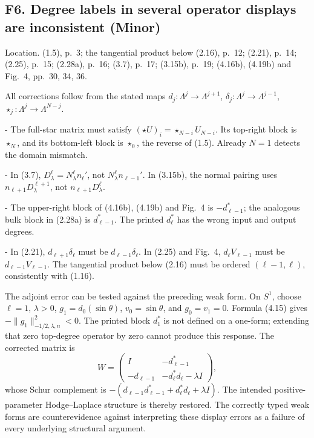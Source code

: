 \documentclass[10pt]{article}
\begin{document}
\subsection*{F6. Degree labels in several operator displays are inconsistent (Minor)}
Location. (1.5), p. 3; the tangential product below (2.16), p. 12; (2.21), p. 14; (2.25), p. 15; (2.28a), p. 16; (3.7), p. 17; (3.15b), p. 19; (4.16b), (4.19b) and Fig. 4, pp. 30, 34, 36.\par
All corrections follow from the stated maps \(d_j:\Lambda^j\to\Lambda^{j+1}\), \(\delta_j:\Lambda^j\to\Lambda^{j-1}\), \(\star_j:\Lambda^j\to\Lambda^{N-j}\).\par
- The full-star matrix must satisfy \((\star U)_i=\star_{N-i}U_{N-i}\). Its top-right block is \(\star_N\), and its bottom-left block is \(\star_0\), the reverse of (1.5). Already \(N=1\) detects the domain mismatch.\par
- In (3.7), \(D_\lambda^\ell=N_\lambda^\ell n_\ell'\), not \(N_\lambda^\ell n_{\ell-1}'\). In (3.15b), the normal pairing uses \(n_{\ell+1}D_\lambda^{\ell+1}\), not \(n_{\ell+1}D_\lambda^\ell\).\par
- The upper-right block of (4.16b), (4.19b) and Fig. 4 is \(-d_{\ell-1}^*\); the analogous bulk block in (2.28a) is \(d_{\ell-1}^*\). The printed \(d_\ell^*\) has the wrong input and output degrees.\par
- In (2.21), \(d_{\ell+1}\delta_\ell\) must be \(d_{\ell-1}\delta_\ell\). In (2.25) and Fig. 4, \(d_\ell V_{\ell-1}\) must be \(d_{\ell-1}V_{\ell-1}\). The tangential product below (2.16) must be ordered \((\ell-1,\ell)\), consistently with (1.16).\par
The adjoint error can be tested against the preceding weak form. On \(S^1\), choose \(\ell=1\), \(\lambda>0\), \(g_1=d_0(\sin\theta)\), \(v_0=\sin\theta\), and \(g_0=v_1=0\). Formula (4.15) gives \(-\|g_1\|_{-1/2,\lambda,n}^2<0\). The printed block \(d_1^*\) is not defined on a one-form; extending that zero top-degree operator by zero cannot produce this response. The corrected matrix is \[W=
 \begin{pmatrix}
 I&-d_{\ell-1}^*\\
 -d_{\ell-1}&-d_\ell^*d_\ell-\lambda I
 \end{pmatrix},\] whose Schur complement is \(-(d_{\ell-1}d_{\ell-1}^*+d_\ell^*d_\ell+\lambda I)\). The intended positive-parameter Hodge–Laplace structure is thereby restored. The correctly typed weak forms are counterevidence against interpreting these display errors as a failure of every underlying structural argument.\par
\end{document}
